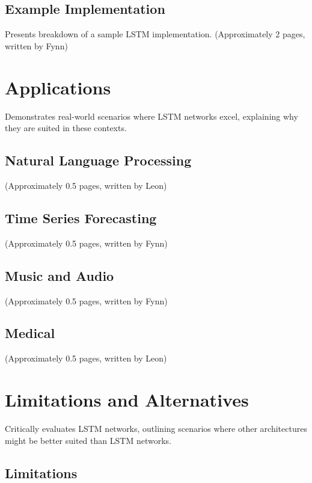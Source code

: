 \documentclass[twoside,a4paper,10pt,DIV=12,BCOR=12mm]{scrartcl}
\begin{document}
\subsection{Example Implementation}

Presents breakdown of a sample LSTM implementation.
(Approximately 2 pages, written by Fynn)

\section{Applications}

Demonstrates real-world scenarios where LSTM networks excel, explaining why they are suited in these contexts.

\subsection{Natural Language Processing}

(Approximately 0.5 pages, written by Leon)

\subsection{Time Series Forecasting}

(Approximately 0.5 pages, written by Fynn)

\subsection{Music and Audio}

(Approximately 0.5 pages, written by Fynn)

\subsection{Medical}

(Approximately 0.5 pages, written by Leon)

\section{Limitations and Alternatives}

Critically evaluates LSTM networks, outlining scenarios where other architectures might be better suited than LSTM networks.

\subsection{Limitations}
\end{document}
